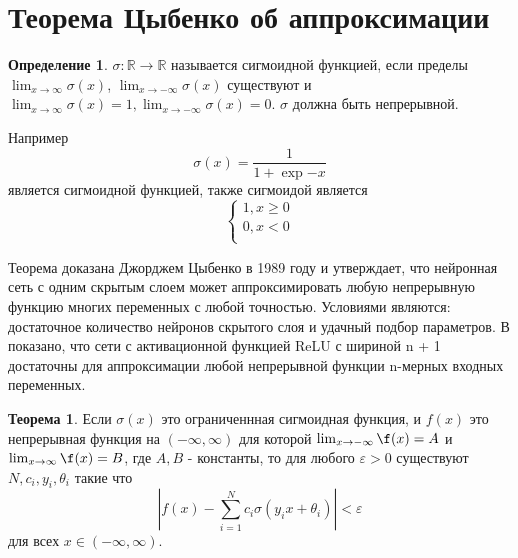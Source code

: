 \documentclass[12pt, twoside]{article}
\theoremstyle{definition}
\newtheorem*{theorem*}{Теорема}
\newtheorem*{definition*}{Определение}
\begin{document}


\section{Теорема Цыбенко об аппроксимации}
\begin{definition*}
$\sigma: \mathbb{R} \to \mathbb{R}$ называется сигмоидной функцией, если пределы $\lim_{x \to \infty} \sigma(x)$, $\lim_{x \to -\infty} \sigma(x)$ существуют и $\lim_{x \to \infty} \sigma(x) = 1, \lim_{x \to -\infty} \sigma(x) = 0$. $\sigma$ должна быть непрерывной.
\end{definition*}
Например 
$$\sigma(x) = \frac{1}{1+\exp{-x}}$$
является сигмоидной функцией, также сигмоидой является 
\[ \begin{cases} 
      1, x\geqslant0 \\
      0, x<0 \\
   \end{cases}
\]

Теорема доказана Джорджем Цыбенко в 1989 году и утверждает, что нейронная сеть с одним скрытым слоем может аппроксимировать любую непрерывную функцию многих переменных с любой точностью. Условиями являются: достаточное количество нейронов скрытого слоя и удачный подбор параметров. В \cite{bib_1} показано, что сети с активационной функцией ReLU с шириной n + 1 достаточны для аппроксимации любой непрерывной функции n-мерных входных переменных.
\begin{theorem*}
Если $\sigma(x)$ это ограниченнная сигмоидная функция, и $f(x)$ это непрерывная функция на $(-\infty,\infty)$ для которой $\lim_{x \to -\infty} \f(x) = A$ и $\lim_{x \to \infty} \f(x) = B$, где $A,B$ - константы, то для любого $\varepsilon>0$ существуют $N, c_{i}, y_{i}, \theta_{i}$ такие что
$$|f(x)-\sum\limits_{i=1}^Nc_i\sigma(y_{i}x+\theta_{i})|<\varepsilon$$
для всех $x\in(-\infty,\infty)$.
\end{theorem*}
\end{document}
